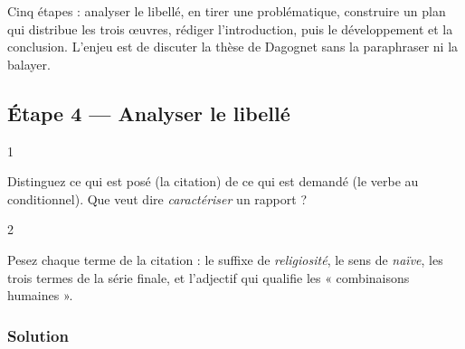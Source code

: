 \documentclass[11pt,a4paper]{article}
\begin{document}
Cinq étapes : analyser le libellé, en tirer une problématique, construire un plan qui distribue les trois œuvres, rédiger l'introduction, puis le développement et la conclusion. L'enjeu est de discuter la thèse de Dagognet sans la paraphraser ni la balayer.

\hypertarget{uxe9tape-4-analyser-le-libelluxe9}{%
\subsection{Étape 4 --- Analyser le libellé}\label{uxe9tape-4-analyser-le-libelluxe9}}

\begin{indication}{1}

Distinguez ce qui est posé (la citation) de ce qui est demandé (le verbe au conditionnel). Que veut dire \emph{caractériser} un rapport ?

\end{indication}

\begin{indication}{2}

Pesez chaque terme de la citation : le suffixe de \emph{religiosité}, le sens de \emph{naïve}, les trois termes de la série finale, et l'adjectif qui qualifie les « combinaisons humaines ».

\end{indication}

\hypertarget{solution-3}{%
\subsubsection{Solution}\label{solution-3}}
\end{document}
